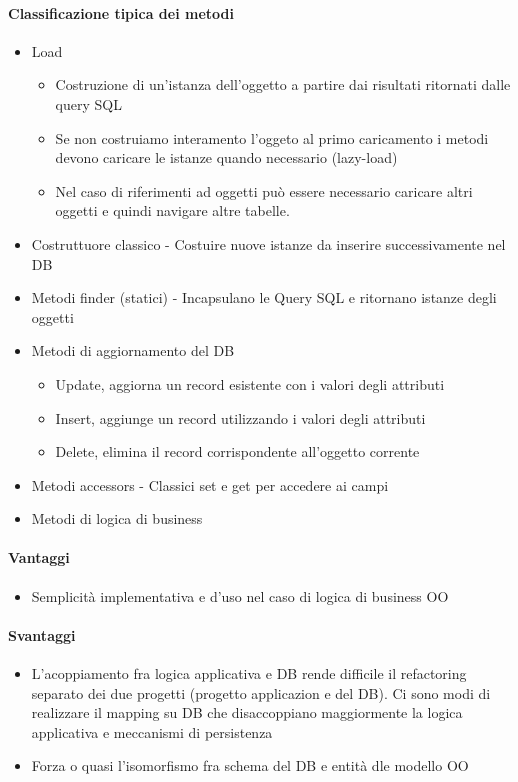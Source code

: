 \paragraph*{Classificazione tipica dei metodi}
\begin{itemize}
    \item Load \begin{itemize}
        \item Costruzione di un'istanza dell'oggetto a partire dai risultati ritornati dalle query SQL
        \item Se non costruiamo interamento l'oggeto al primo caricamento i metodi devono caricare le istanze
        quando necessario (lazy-load)
        \item Nel caso di riferimenti ad oggetti può essere necessario caricare altri oggetti e quindi navigare
        altre tabelle.
    \end{itemize}
    \item Costruttuore classico - Costuire nuove istanze da inserire successivamente nel DB
    \item Metodi finder (statici) - Incapsulano le Query SQL e ritornano istanze degli oggetti
    \item Metodi di aggiornamento del DB \begin{itemize}
        \item Update, aggiorna un record esistente con i valori degli attributi
        \item Insert, aggiunge un record utilizzando i valori degli attributi
        \item Delete, elimina il record corrispondente all'oggetto corrente
    \end{itemize}
    \item Metodi accessors - Classici set e get per accedere ai campi
    \item Metodi di logica di business
\end{itemize}
\paragraph*{Vantaggi}
\begin{itemize}
    \item Semplicità implementativa e d'uso nel caso di logica di business OO
\end{itemize}
\paragraph*{Svantaggi}
\begin{itemize}
    \item L'acoppiamento fra logica applicativa e DB rende difficile il refactoring separato
    dei due progetti (progetto applicazion e del DB). Ci sono modi di realizzare il mapping su DB
    che disaccoppiano maggiormente la logica applicativa e meccanismi di persistenza
    \item Forza o quasi l'isomorfismo fra schema del DB e entità dle modello OO
\end{itemize}

